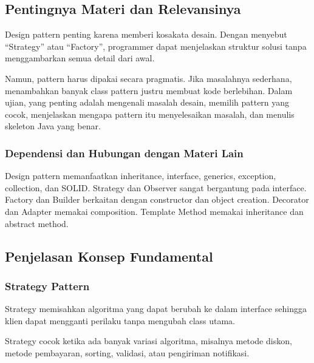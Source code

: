 \subsection{Pentingnya Materi dan Relevansinya}

\begin{jawab}
Design pattern penting karena memberi kosakata desain. Dengan menyebut ``Strategy'' atau ``Factory'', programmer dapat menjelaskan struktur solusi tanpa menggambarkan semua detail dari awal.
\end{jawab}

Namun, pattern harus dipakai secara pragmatis. Jika masalahnya sederhana, menambahkan banyak class pattern justru membuat kode berlebihan. Dalam ujian, yang penting adalah mengenali masalah desain, memilih pattern yang cocok, menjelaskan mengapa pattern itu menyelesaikan masalah, dan menulis skeleton Java yang benar.

\subsubsection{Dependensi dan Hubungan dengan Materi Lain}

Design pattern memanfaatkan inheritance, interface, generics, exception, collection, dan SOLID. Strategy dan Observer sangat bergantung pada interface. Factory dan Builder berkaitan dengan constructor dan object creation. Decorator dan Adapter memakai composition. Template Method memakai inheritance dan abstract method.

\subsection{Penjelasan Konsep Fundamental}

\subsubsection{Strategy Pattern}

\begin{jawab}
Strategy memisahkan algoritma yang dapat berubah ke dalam interface sehingga klien dapat mengganti perilaku tanpa mengubah class utama.
\end{jawab}

Strategy cocok ketika ada banyak variasi algoritma, misalnya metode diskon, metode pembayaran, sorting, validasi, atau pengiriman notifikasi.

